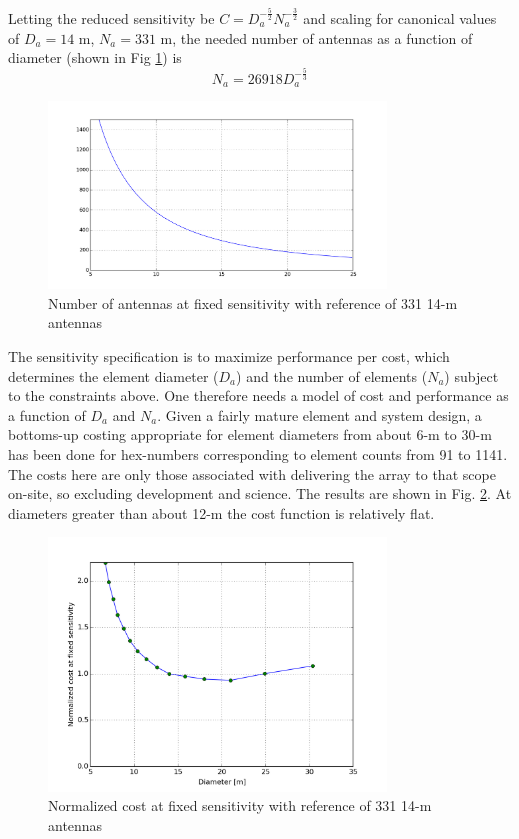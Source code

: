 \documentclass[11pt]{article}
\begin{document}
Letting the reduced sensitivity be $C = D_a^{-\frac{5}{2}}N_a^{-\frac{3}{2}}$ and scaling for canonical values of $D_a = 14$ m, $N_a = 331$ m, the needed number of antennas as a function of diameter (shown in Fig \ref{fig:Nsens}) is
\begin{equation}
\label{eq:Nmetric}
N_a = 26918 D_a^{-\frac{5}{3}}
\end{equation}

\begin{figure}[h]
\centering
\includegraphics[width=0.8\textwidth]{Nsens.png}
\caption{Number of antennas at fixed sensitivity with reference of 331 14-m antennas}
\label{fig:Nsens}
\end{figure}

The sensitivity specification is to maximize performance per cost, which determines the element 
diameter ($D_a$) and the number of elements ($N_a$) subject to the constraints above.  One therefore 
needs a model of cost and performance as a function of $D_a$ and $N_a$.  Given a fairly mature element
and system design, a bottoms-up costing appropriate for element diameters from about 6-m to 30-m 
has been done for hex-numbers corresponding to element counts from 91 to 1141.  The costs here
are only those associated with delivering the array to that scope on-site, so excluding development and
science.  The results are shown in Fig. \ref{fig:normcost}.  At diameters greater than about 12-m the cost function
is relatively flat.

\begin{figure}[h]
\centering
\includegraphics[width=0.8\textwidth]{normcostfunc.png}
\caption{Normalized cost at fixed sensitivity with reference of 331 14-m antennas}
\label{fig:normcost}
\end{figure}



\end{document}
